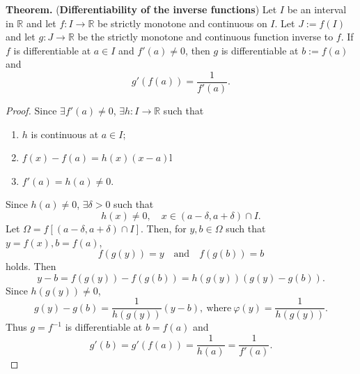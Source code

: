 \documentclass[12pt,a4paper]{article}
\begin{document}
\begin{tcolorbox}[colback=white]
	\textbf{Theorem.} (\textbf{Differentiability of the inverse functions}) Let $I$ be an interval in $\mathbb{R}$ and let $f:I\to\mathbb{R}$ be strictly monotone and continuous on $I$. Let $J:=f(I)$ and let $g:J\to\mathbb{R}$ be the strictly monotone and continuous function inverse to $f$. If $f$ is differentiable at $a\in I$ and $f'(a)\neq 0$, then $g$ is differentiable at $b:=f(a)$ and \[
	g'(f(a))=\frac{1}{f'(a)}.
	\]\tcblower\begin{proof}
		Since $\exists f'(a)\neq 0$, $\exists h:I\to\mathbb{R}$ such that \begin{enumerate}[($i$)]
			\item $h$ is continuous at $a\in I$;
			\item $f(x)-f(a)=h(x)(x-a)$l
			\item $f'(a)=h(a)\neq0$.
		\end{enumerate} Since $h(a)\neq 0$, $\exists\delta>0$ such that \[
	h(x)\neq 0,\quad x\in(a-\delta,a+\delta)\cap I.
	\] Let $\Omega=f[(a-\delta,a+\delta)\cap I]$. Then, for $y,b\in\Omega$ such that $y=f(x), b=f(a)$, \[
	f(g(y))=y\quad\text{and}\quad f(g(b))=b
	\] holds. Then \[
	y-b=f(g(y))-f(g(b)) = h(g(y))(g(y)-g(b)).
	\] Since $h(g(y))\neq0$, \[
	g(y)-g(b)=\frac{1}{h(g(y))}(y-b),\ \text{where}\ \varphi(y)=\frac{1}{h(g(y))}.
	\] Thus $g=f^{-1}$ is differentiable at $b=f(a)$ and \[
	g'(b)=g'(f(a))=\frac{1}{h(a)}=\frac{1}{f'(a)}.
	\]
	\end{proof}
\end{tcolorbox}
\end{document}

